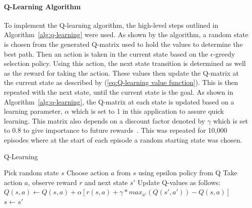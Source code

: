 \documentclass[12pt,american]{report}
\begin{document}
\paragraph{Q-Learning Algorithm}
To implement the Q-learning algorithm, the high-level steps outlined in Algorithm~\ref{alg:q-learning} were used.  As shown by the algorithm, a random state is chosen from the generated Q-matrix used to hold the values to determine the best path.  Then an action is taken in the current state based on the \begin{math}\epsilon\end{math}-greedy selection policy.  Using this action, the next state transition is determined as well as the reward for taking the action.  These values then update the Q-matrix at the current state as described by (\ref{eq:Q-learning value function}). This is then repeated with the next state, until the current state is the goal. As shown in Algorithm~\ref{alg:q-learning}, the Q-matrix at each state is updated based on a learning parameter, \begin{math}\alpha\end{math} which is set to 1 in this application to assure quick learning. This matrix also depends on a discount factor denoted by \begin{math}\gamma\end{math} which is set to 0.8 to give importance to future rewards~\cite{Eden}. This was repeated for 10,000 episodes where at the start of each episode a random starting state was chosen. 

\begin{algorithm}
\caption{Q-Learning~\cite{Eden}}
\label{alg:q-learning}
\begin{algorithmic} 
\State Pick random state $s$
\State Choose action $a$ from $s$ using epsilon policy from Q
\State Take action $a$, observe reward $r$ and next state $s'$
\State Update Q-values as follows:
\State $Q(s,a) \leftarrow Q(s,a) + \alpha [r(s,a)+ \gamma*max_{a'}(Q(s',a')) - Q(s,a)] $
\State $s \leftarrow s'$
\EndWhile
\EndFor
\end{algorithmic}
\end{algorithm}
\end{document}
